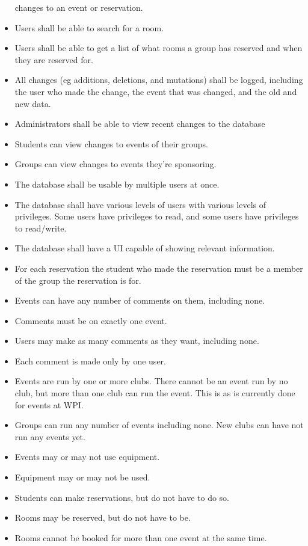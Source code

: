 \documentclass{article}
\begin{document}
\begin{itemize}
changes to an event or reservation.
\item Users shall be able to search for a room.
\item Users shall be able to get a list of what rooms a group has
reserved and when they are reserved for.
\item All changes (eg additions, deletions, and mutations) shall be
logged, including the user who made the change, the event that was
changed, and the old and new data.
\item Administrators shall be able to view recent changes to the database
\item Students can view changes to events of their groups.
\item Groups can view changes to events they're sponsoring.
\item The database shall be usable by multiple users at once.
\item The database shall have various levels of users with various
levels of privileges. Some users have privileges to read, and some
users have privileges to read/write.
\item The database shall have a UI capable of showing relevant information.
\item For each reservation the student who made the reservation must
be a member of the group the reservation is for.
\item Events can have any number of comments on them, including none.
\item Comments must be on exactly one event.
\item Users may make as many comments as they want, including none.
\item Each comment is made only by one user.
\item Events are run by one or more clubs. There cannot be an event run by no
club, but more than one club can run the event. This is as is currently done for
events at WPI.  
\item Groups can run any number of events including none. New clubs can have not
run any events yet. 
\item Events may or may not use equipment.
\item Equipment may or may not be used. 
\item  Students can make reservations, but do not have to do so.
\item Rooms may be reserved, but do not have to be.
\item Rooms cannot be booked for more than one event at the same time. 

\end{itemize}
\end{document}
